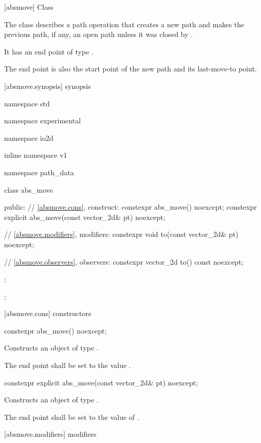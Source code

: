  [absmove] {Class }

\pnum
{}
The class  describes a path operation that creates a new path and makes the previous path, if any, an open path unless it was closed by .

\pnum
It has an end point of type .

\pnum
The end point is also the start point of the new path and its last-move-to point.

 [absmove.synopsis] { synopsis}

\begin{codeblock}
namespace std { namespace experimental { namespace io2d { inline namespace v1 {
  namespace path_data {
    class abs_move {
    public:
      // \ref{absmove.cons}, construct:
      constexpr abs_move() noexcept;
      constexpr explicit abs_move(const vector_2d& pt) noexcept;

      // \ref{absmove.modifiers}, modifiers:
      constexpr void to(const vector_2d& pt) noexcept;

      // \ref{absmove.observers}, observers:
      constexpr vector_2d to() const noexcept;
    };
  };
} } } }
\end{codeblock}

 [absmove.cons] { constructors}

\begin{itemdecl}
constexpr abs_move() noexcept;
\end{itemdecl}
\begin{itemdescr}
\pnum
\effects
Constructs an object of type .

\pnum
The end point shall be set to the value .
\end{itemdescr}

\begin{itemdecl}
constexpr explicit abs_move(const vector_2d& pt) noexcept;
\end{itemdecl}
\begin{itemdescr}
\pnum
\effects
Constructs an object of type .

\pnum
The end point shall be set to the value of .
\end{itemdescr}

 [absmove.modifiers]{ modifiers}

